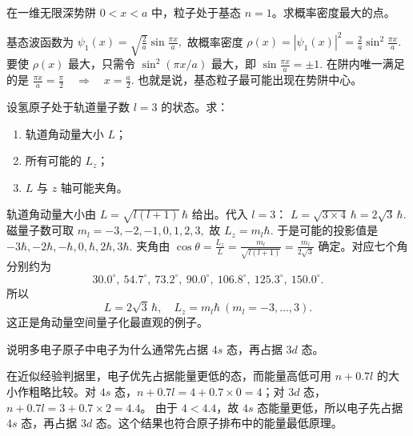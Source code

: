 \documentclass[lang=cn,11pt]{elegantbook}
\begin{document}
\begin{exercise}[无限深势阱基态概率密度最大在哪]
在一维无限深势阱 \(0<x<a\) 中，粒子处于基态 \(n=1\)。求概率密度最大的点。
\end{exercise}

\begin{solution}
基态波函数为
 \(\psi_1(x)=\sqrt{\frac{2}{a}}\sin\frac{\pi x}{a},\) 
故概率密度
 \(\rho(x)=|\psi_1(x)|^2=\frac{2}{a}\sin^2\frac{\pi x}{a}.\) 
要使 \(\rho(x)\) 最大，只需令 \(\sin^2(\pi x/a)\) 最大，即
 \(\sin\frac{\pi x}{a}=\pm 1.\) 
在阱内唯一满足的是
 \(\frac{\pi x}{a}=\frac{\pi}{2} \quad\Longrightarrow\quad \boxed{x=\frac{a}{2}}.\) 
也就是说，基态粒子最可能出现在势阱中心。
\end{solution}

\begin{exercise}[氢原子 \(l=3\) 态的角动量、投影与夹角]
设氢原子处于轨道量子数 \(l=3\) 的状态。求：
\begin{enumerate}
 \item 轨道角动量大小 \(L\)；
 \item 所有可能的 \(L_z\)；
 \item \(L\) 与 \(z\) 轴可能夹角。
\end{enumerate}
\end{exercise}

\begin{solution}
轨道角动量大小由
 \(L=\sqrt{l(l+1)}\,\hbar\) 
给出。代入 \(l=3\)：
 \(L=\sqrt{3\times 4}\,\hbar=2\sqrt3\,\hbar.\) 
磁量子数可取
 \(m_l=-3,-2,-1,0,1,2,3,\) 
故
 \(L_z=m_l\hbar.\) 
于是可能的投影值是
 \(-3\hbar,-2\hbar,-\hbar,0,\hbar,2\hbar,3\hbar.\) 
夹角由
 \(\cos\theta=\frac{L_z}{L} =\frac{m_l}{\sqrt{l(l+1)}}=\frac{m_l}{2\sqrt3}\) 
确定。对应七个角分别约为
\[
30.0^\circ,\ 54.7^\circ,\ 73.2^\circ,\ 90.0^\circ,\ 106.8^\circ,\ 125.3^\circ,\ 150.0^\circ.
\]
所以
\[
\boxed{L=2\sqrt3\,\hbar,\quad L_z=m_l\hbar\ (m_l=-3,\dots,3).}
\]
这正是角动量空间量子化最直观的例子。
\end{solution}

\begin{exercise}[为什么先填 \(4s\) 再填 \(3d\)]
说明多电子原子中电子为什么通常先占据 \(4s\) 态，再占据 \(3d\) 态。
\end{exercise}

\begin{solution}
在近似经验判据里，电子优先占据能量更低的态，而能量高低可用 \(n+0.7l\) 的大小作粗略比较。对 \(4s\) 态，\(n+0.7l=4+0.7\times0=4\)；对 \(3d\) 态，\(n+0.7l=3+0.7\times2=4.4\)。
由于 \(4<4.4\)，故 \(4s\) 态能量更低，所以电子先占据 \(4s\) 态，再占据 \(3d\) 态。这个结果也符合原子排布中的能量最低原理。
\end{solution}
\end{document}
